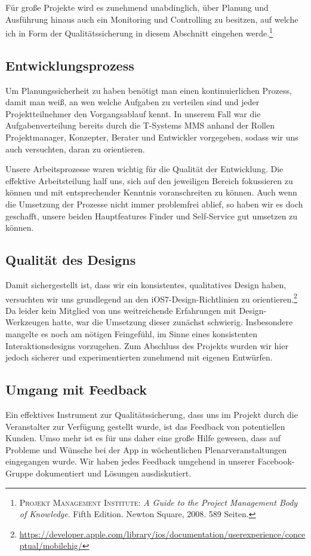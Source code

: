 	Für große Projekte wird es zunehmend unabdinglich, über Planung und Ausführung hinaus auch ein Monitoring und Controlling zu besitzen, auf welche ich in Form der Qualitätssicherung in diesem Abschnitt eingehen werde.\footnote{\textsc{Projekt Management Institute}: \textit{A Guide to the Project Management Body of Knowledge}. Fifth Edition. Newton Square, 2008. 589 Seiten.}

\subsection{Entwicklungsprozess}
	Um Planungssicherheit zu haben benötigt man einen kontinuierlichen Prozess, damit man weiß, an wen welche Aufgaben zu verteilen sind und jeder Projektteilnehmer den Vorgangsablauf kennt. In unserem Fall war die Aufgabenverteilung bereits durch die T-Systems MMS anhand der Rollen Projektmanager, Konzepter, Berater und Entwickler vorgegeben, sodass wir uns auch versuchten, daran zu orientieren. 
	
	Unsere Arbeitsprozesse waren wichtig für die Qualität der Entwicklung. Die effektive Arbeitsteilung half uns, sich auf den jeweiligen Bereich fokussieren zu können und mit entsprechender Kenntnis voranschreiten zu können. Auch wenn die Umsetzung der Prozesse nicht immer problemfrei ablief, so haben wir es doch geschafft, unsere beiden Hauptfeatures Finder und Self-Service gut umsetzen zu können.

\subsection{Qualität des Designs}
	Damit sichergestellt ist, dass wir ein konsistentes, qualitatives Design haben, versuchten wir uns grundlegend an den iOS7-Design-Richtlinien zu orientieren.\footnote{\url{https://developer.apple.com/library/ios/documentation/userexperience/conceptual/mobilehig/}} Da leider kein Mitglied von uns weitreichende Erfahrungen mit Design-Werkzeugen hatte, war die Umsetzung dieser zunächst schwierig. Insbesondere mangelte es noch am nötigen Feingefühl, im Sinne eines konsistenten Interaktionsdesigns vorzugehen. Zum Abschluss des Projekts wurden wir hier jedoch sicherer und experimentierten zunehmend mit eigenen Entwürfen.

\subsection{Umgang mit Feedback}
	Ein effektives Instrument zur Qualitätssicherung, dass uns im Projekt durch die Veranstalter zur Verfügung gestellt wurde, ist das Feedback von potentiellen Kunden. Umso mehr ist es für uns daher eine große Hilfe gewesen, dass auf Probleme und Wünsche bei der App in wöchentlichen Plenarveranstaltungen eingegangen wurde. Wir haben jedes Feedback umgehend in unserer Facebook-Gruppe dokumentiert und Lösungen ausdiskutiert.
	
